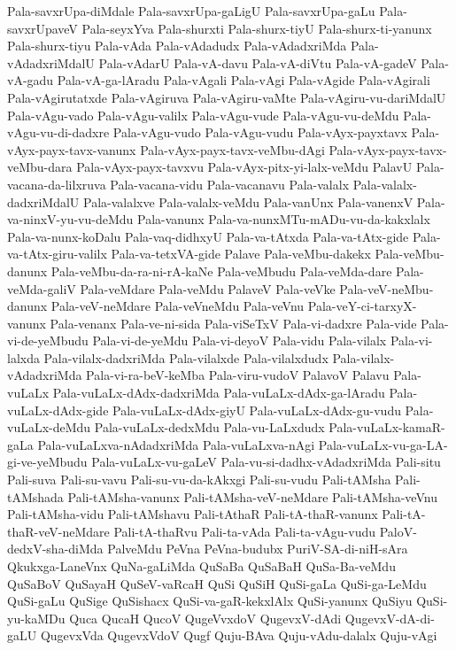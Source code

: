 {Pala-savxrUpa-diMdale
Pala-savxrUpa-gaLigU
Pala-savxrUpa-gaLu
Pala-savxrUpaveV
Pala-seyxYva
Pala-shurxti
Pala-shurx-tiyU
Pala-shurx-ti-yanunx
Pala-shurx-tiyu
Pala-vAda
Pala-vAdadudx
Pala-vAdadxriMda
Pala-vAdadxriMdalU
Pala-vAdarU
Pala-vA-davu
Pala-vA-diVtu
Pala-vA-gadeV
Pala-vA-gadu
Pala-vA-ga-lAradu
Pala-vAgali
Pala-vAgi
Pala-vAgide
Pala-vAgirali
Pala-vAgirutatxde
Pala-vAgiruva
Pala-vAgiru-vaMte
Pala-vAgiru-vu-dariMdalU
Pala-vAgu-vado
Pala-vAgu-valilx
Pala-vAgu-vude
Pala-vAgu-vu-deMdu
Pala-vAgu-vu-di-dadxre
Pala-vAgu-vudo
Pala-vAgu-vudu
Pala-vAyx-payxtavx
Pala-vAyx-payx-tavx-vanunx
Pala-vAyx-payx-tavx-veMbu-dAgi
Pala-vAyx-payx-tavx-veMbu-dara
Pala-vAyx-payx-tavxvu
Pala-vAyx-pitx-yi-lalx-veMdu
PalavU
Pala-vacana-da-lilxruva
Pala-vacana-vidu
Pala-vacanavu
Pala-valalx
Pala-valalx-dadxriMdalU
Pala-valalxve
Pala-valalx-veMdu
Pala-vanUnx
Pala-vanenxV
Pala-va-ninxV-yu-vu-deMdu
Pala-vanunx
Pala-va-nunxMTu-mADu-vu-da-kakxlalx
Pala-va-nunx-koDalu
Pala-vaq-didhxyU
Pala-va-tAtxda
Pala-va-tAtx-gide
Pala-va-tAtx-giru-valilx
Pala-va-tetxVA-gide
Palave
Pala-veMbu-dakekx
Pala-veMbu-danunx
Pala-veMbu-da-ra-ni-rA-kaNe
Pala-veMbudu
Pala-veMda-dare
Pala-veMda-galiV
Pala-veMdare
Pala-veMdu
PalaveV
Pala-veVke
Pala-veV-neMbu-danunx
Pala-veV-neMdare
Pala-veVneMdu
Pala-veVnu
Pala-veY-ci-tarxyX-vanunx
Pala-venanx
Pala-ve-ni-sida
Pala-viSeTxV
Pala-vi-dadxre
Pala-vide
Pala-vi-de-yeMbudu
Pala-vi-de-yeMdu
Pala-vi-deyoV
Pala-vidu
Pala-vilalx
Pala-vi-lalxda
Pala-vilalx-dadxriMda
Pala-vilalxde
Pala-vilalxdudx
Pala-vilalx-vAdadxriMda
Pala-vi-ra-beV-keMba
Pala-viru-vudoV
PalavoV
Palavu
Pala-vuLaLx
Pala-vuLaLx-dAdx-dadxriMda
Pala-vuLaLx-dAdx-ga-lAradu
Pala-vuLaLx-dAdx-gide
Pala-vuLaLx-dAdx-giyU
Pala-vuLaLx-dAdx-gu-vudu
Pala-vuLaLx-deMdu
Pala-vuLaLx-dedxMdu
Pala-vu-LaLxdudx
Pala-vuLaLx-kamaR-gaLa
Pala-vuLaLxva-nAdadxriMda
Pala-vuLaLxva-nAgi
Pala-vuLaLx-vu-ga-LA-gi-ve-yeMbudu
Pala-vuLaLx-vu-gaLeV
Pala-vu-si-dadhx-vAdadxriMda
Pali-situ
Pali-suva
Pali-su-vavu
Pali-su-vu-da-kAkxgi
Pali-su-vudu
Pali-tAMsha
Pali-tAMshada
Pali-tAMsha-vanunx
Pali-tAMsha-veV-neMdare
Pali-tAMsha-veVnu
Pali-tAMsha-vidu
Pali-tAMshavu
Pali-tAthaR
Pali-tA-thaR-vanunx
Pali-tA-thaR-veV-neMdare
Pali-tA-thaRvu
Pali-ta-vAda
Pali-ta-vAgu-vudu
PaloV-dedxV-sha-diMda
PalveMdu
PeVna
PeVna-budubx
PuriV-SA-di-niH-sAra
Qkukxga-LaneVnx
QuNa-gaLiMda
QuSaBa
QuSaBaH
QuSa-Ba-veMdu
QuSaBoV
QuSayaH
QuSeV-vaRcaH
QuSi
QuSiH
QuSi-gaLa
QuSi-ga-LeMdu
QuSi-gaLu
QuSige
QuSishacx
QuSi-va-gaR-kekxlAlx
QuSi-yanunx
QuSiyu
QuSi-yu-kaMDu
Quca
QucaH
QucoV
QugeVvxdoV
QugevxV-dAdi
QugevxV-dA-di-gaLU
QugevxVda
QugevxVdoV
Qugf
Quju-BAva
Quju-vAdu-dalalx
Quju-vAgi
}
